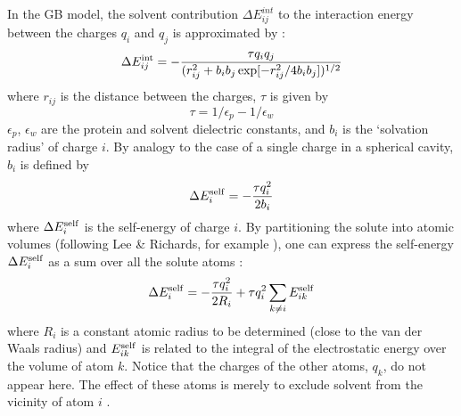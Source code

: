 \documentclass[12pt]{report}
\begin{document}
In the GB model, the solvent contribution $\Delta E^{int}_{ij}$ to the interaction
energy between the charges $q_i$ and $q_j$ is approximated by \cite{Still90}:
\begin{equation} \label{eq:gbinte}
\Delta E^{\rm int}_{ij} =
  -\frac{\tau  q_i q_j }{(r_{ij}^2 + b_i b_j \exp[-r_{ij}^2/4 b_i b_j])^{1/2}}
\end{equation}
where $r_{ij}$ is the distance between the charges, $\tau$ is given by
\begin{equation}
\tau = 1/\epsilon_p - 1/\epsilon_w
\end{equation}
$\epsilon_p$, $\epsilon_w$ are the protein and solvent dielectric constants, and $b_i$ is the `solvation
radius' of charge $i$. By analogy to the case of a single charge in a spherical cavity, $b_i$ is defined by
\begin{equation}  \label{eq:bi}
\Delta E_i^{\rm self} = - \frac{\tau q_i^2}{2 b_i}
\end{equation}
where $\Delta E_i^{\rm self}$ is the self-energy of charge $i$. By partitioning the
solute into atomic volumes (following Lee \& Richards, for example \cite{Lee71}),
one can express the self-energy $\Delta E_i^{\rm self}$ as a sum over all the solute
atoms \cite{Hawkins95,Schaefer96}:
\begin{equation} \label{eq:self}
\Delta E_i^{\rm self} = -\frac{\tau q_i^2}{2 R_i} + \tau q_i^2 \sum_{k \neq i} E_{ik}^{\rm self}
\end{equation}
where $R_i$ is a constant atomic radius to be determined (close to the
van der Waals radius) and $E_{ik}^{\rm self}$ is related to the integral of
the electrostatic energy over the volume of atom $k$. Notice that the
charges of the other atoms, $q_k$, do not appear here. The effect of
these atoms is merely to exclude solvent from the vicinity of atom $i$
\cite{Schaefer90}.
\end{document}
